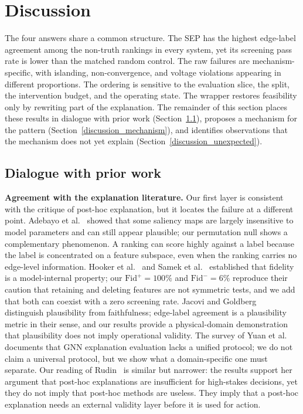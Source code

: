 \section{Discussion}\label{discussion}

The four answers share a common structure. The SEP has the highest edge-label agreement among the non-truth rankings in every system, yet its screening pass rate is lower than the matched random control. The raw failures are mechanism-specific, with islanding, non-convergence, and voltage violations appearing in different proportions. The ordering is sensitive to the evaluation slice, the split, the intervention budget, and the operating state. The wrapper restores feasibility only by rewriting part of the explanation. The remainder of this section places these results in dialogue with prior work (Section~\ref{discussion_literature}), proposes a mechanism for the pattern (Section~\ref{discussion_mechanism}), and identifies observations that the mechanism does not yet explain (Section~\ref{discussion_unexpected}).

\subsection{Dialogue with prior work}\label{discussion_literature}

\textbf{Agreement with the explanation literature.} Our first layer is consistent with the critique of post-hoc explanation, but it locates the failure at a different point. Adebayo et al.~\citep{adebayo2018} showed that some saliency maps are largely insensitive to model parameters and can still appear plausible; our permutation null shows a complementary phenomenon. A ranking can score highly against a label because the label is concentrated on a feature subspace, even when the ranking carries no edge-level information. Hooker et al.~\citep{hooker2019} and Samek et al.~\citep{samek2017} established that fidelity is a model-internal property; our $\mathrm{Fid}^{+}=100\%$ and $\mathrm{Fid}^{-}=6\%$ reproduce their caution that retaining and deleting features are not symmetric tests, and we add that both can coexist with a zero screening rate. Jacovi and Goldberg~\citep{jacovi2020} distinguish plausibility from faithfulness; edge-label agreement is a plausibility metric in their sense, and our results provide a physical-domain demonstration that plausibility does not imply operational validity. The survey of Yuan et al.~\citep{yuan2022} documents that GNN explanation evaluation lacks a unified protocol; we do not claim a universal protocol, but we show what a domain-specific one must separate. Our reading of Rudin~\citep{rudin2019} is similar but narrower: the results support her argument that post-hoc explanations are insufficient for high-stakes decisions, yet they do not imply that post-hoc methods are useless. They imply that a post-hoc explanation needs an external validity layer before it is used for action.

